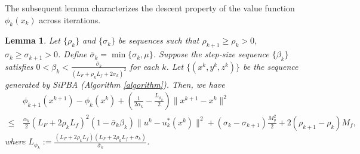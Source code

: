 \documentclass{article}
\newtheorem{lemma}[theorem]{Lemma}
\def\x{x}
\begin{document}
     
The subsequent lemma characterizes the descent property of the value function $\phi_{k}(\x_k)$ across iterations.

	 \begin{lemma}\label{xdescentlemma}
Let $\{\rho_k\}$ and $\{\sigma_k\}$ be sequences such that  $\rho_{k+1} \ge \rho_{k}>0$, $\sigma_{k} \ge\sigma_{k+1}>0$. Define $\bar{\sigma}_k = \min\{\sigma_k, \mu\}$. Suppose the step-size sequence $\{\beta_k\}$ satisfies $0<\beta_k<\frac{\bar{\sigma}_k}{(L_F + \rho_k L_f + 2\sigma_k)^2}$ for each $k$. Let $\{(x^k, y^k, z^k)\}$ be the sequence generated by SiPBA (Algorithm \ref{algorithm}). Then, we have 
        \begin{equation}\label{xdescentlemma_eq}
            \begin{aligned}
                & \phi_{k+1}(x^{k+1})-\phi_{k}(x^k) + \left( \frac{1}{2\alpha_k} - \frac{L_{\phi_k}}{2}\right) \|x^{k+1}-x^{k}\|^2 \\ \le\, & \frac{\alpha_k}{2} (L_F + 2\rho_k L_f)^2 (1-\bar{\sigma}_k \beta_k) \| u^{k}- u_{k}^*(x^k)\|^2 + \left( \sigma_k - \sigma_{k+1} \right)\frac{M_y^2 }{2} + 2\left(\rho_{k+1}-\rho_{k}\right)M_f,
            \end{aligned}
        \end{equation}
 	where $L_{\phi_k}:= \frac{(L_F + 2\rho_kL_f)(L_{F}+2\rho_kL_{f} + \bar{\sigma}_k)}{\bar{\sigma}_k} $.
       	 \end{lemma}
\end{document}
